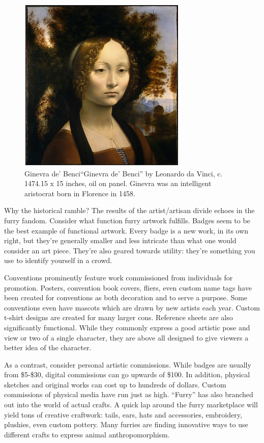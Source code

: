\begin{figure}
  \begin{center}
    \includegraphics{content/assets/furry-art--ginevra}
  \end{center}
  \caption{Ginevra de' Benci``Ginevra de' Benci'' by Leonardo da Vinci, c. 1474.15 x 15 inches, oil on panel. Ginevra was an intelligent aristocrat born in Florence in 1458.}
\end{figure}

Why the historical ramble? The results of the artist/artisan divide echoes in the furry fandom. Consider what function furry artwork fulfills. Badges seem to be the best example of functional artwork. Every badge is a new work, in its own right, but they're generally smaller and less intricate than what one would consider an art piece. They're also geared towards utility: they're something you use to identify yourself in a crowd.

Conventions prominently feature work commissioned from individuals for promotion. Posters, convention book covers, fliers, even custom name tags have been created for conventions as both decoration and to serve a purpose. Some conventions even have mascots which are drawn by new artists each year. Custom t-shirt designs are created for many larger cons. Reference sheets are also significantly functional. While they commonly express a good artistic pose and view or two of a single character, they are above all designed to give viewers a better idea of the character.

As a contrast, consider personal artistic commissions. While badges are usually from \$5-\$30, digital commissions can go upwards of \$100. In addition, physical sketches and original works can cost up to hundreds of dollars. Custom commissions of physical media have run just as high. ``Furry'' has also branched out into the world of actual crafts. A quick lap around the furry marketplace will yield tons of creative craftwork: tails, ears, hats and accessories, embroidery, plushies, even custom pottery. Many furries are finding innovative ways to use different crafts to express animal anthropomorphism.

